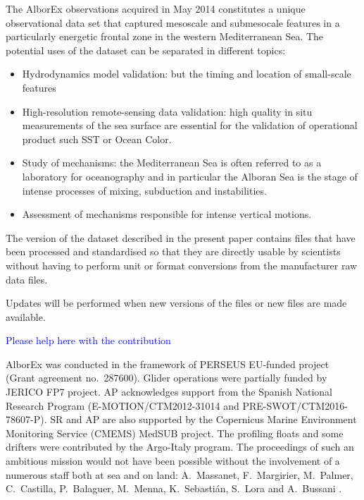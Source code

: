 \documentclass[essd]{copernicus}
\newcommand{\charles}[1]{\textcolor{blue}{#1}}
\begin{document}
The AlborEx observations acquired in May 2014 constitutes a unique observational data set that captured mesoscale and submesocale features in a particularly energetic frontal zone in the western Mediterranean Sea. The potential uses of the dataset can be separated in different topics:
\begin{itemize}
\item Hydrodynamics model validation: but the timing and location of small-scale features 
\item High-resolution remote-sensing data validation: high quality in situ measurements of the sea surface are essential for the validation of operational product such SST or Ocean Color. 
\item Study of mechanisms: the Mediterranean Sea is often referred to as a laboratory for oceanography and in particular the Alboran Sea is the stage of intense processes of mixing, subduction and instabilities.
\item Assessment of mechanisms responsible for intense vertical motions.
\end{itemize} 

The version of the dataset described in the present paper contains files that have been processed and standardised so that they are directly usable by scientists without having to perform unit or format conversions from the manufacturer raw data files.

Updates will be performed when new versions of the files or new files are made available.


\charles{Please help here with the contribution}



\begin{acknowledgements}
AlborEx was conducted in the framework of PERSEUS EU-funded project (Grant agreement no.~287600). Glider operations were partially funded by JERICO FP7 project. AP acknowledges support from the Spanish National Research Program (E-MOTION/CTM2012-31014 and PRE-SWOT/CTM2016-78607-P). SR and AP are also supported by the Copernicus Marine Environment Monitoring Service (CMEMS) MedSUB project. The profiling floats and some drifters were contributed by the Argo-Italy program. The proceedings of such an ambitious mission would not have been possible without the involvement of a numerous staff both at sea and on land: A.~Massanet, F.~Margirier, M.~Palmer, C.~Castilla, P.~Balaguer, M.~Menna, K.~Sebastián, S.~Lora and A.~Bussani .


\end{acknowledgements}

\newpage



\end{document}

